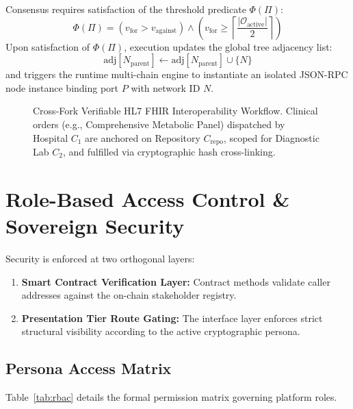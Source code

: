 \documentclass[conference]{IEEEtran}
\theoremstyle{definition}
\begin{document}
Consensus requires satisfaction of the threshold predicate $\Phi(\Pi)$:
\begin{equation}
\Phi(\Pi) = \left( v_{\text{for}} > v_{\text{against}} \right) \land \left( v_{\text{for}} \ge \left\lceil \frac{|\mathcal{O}_{\text{active}}|}{2} \right\rceil \right)
\end{equation}
Upon satisfaction of $\Phi(\Pi)$, execution updates the global tree adjacency list:
\begin{equation}
\text{adj}[N_{\text{parent}}] \leftarrow \text{adj}[N_{\text{parent}}] \cup \{N\}
\end{equation}
and triggers the runtime multi-chain engine to instantiate an isolated JSON-RPC node instance binding port $P$ with network ID $N$.

\begin{figure}[t]
\centering

\caption{Cross-Fork Verifiable HL7 FHIR Interoperability Workflow. Clinical orders (e.g., Comprehensive Metabolic Panel) dispatched by Hospital $C_1$ are anchored on Repository $C_{\text{repo}}$, scoped for Diagnostic Lab $C_2$, and fulfilled via cryptographic hash cross-linking.}
\label{fig:fhir}
\end{figure}

\section{Role-Based Access Control \& Sovereign Security}

Security is enforced at two orthogonal layers:
\begin{enumerate}
    \item \textbf{Smart Contract Verification Layer:} Contract methods validate caller addresses against the on-chain stakeholder registry.
    \item \textbf{Presentation Tier Route Gating:} The interface layer enforces strict structural visibility according to the active cryptographic persona.
\end{enumerate}

\subsection{Persona Access Matrix}
Table~\ref{tab:rbac} details the formal permission matrix governing platform roles.
\end{document}
